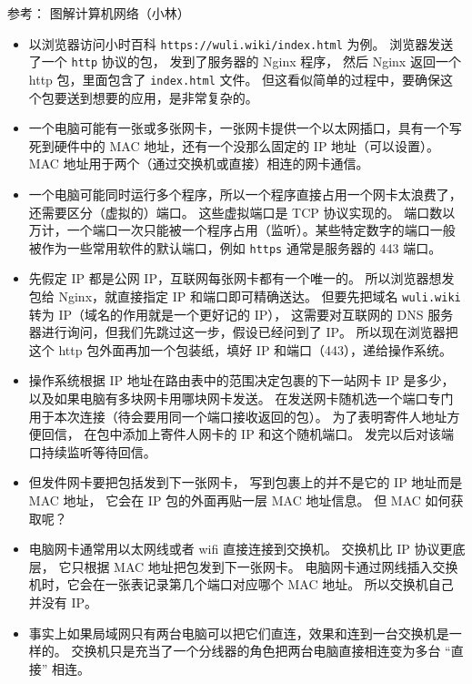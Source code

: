 
\begin{issues}
\issueDraft
\end{issues}

参考： 图解计算机网络（小林）

\begin{itemize}
\item 以浏览器访问小时百科 \verb`https://wuli.wiki/index.html` 为例。 浏览器发送了一个 \verb`http` 协议的包， 发到了服务器的 Nginx 程序， 然后 Nginx 返回一个 http 包，里面包含了 \verb`index.html` 文件。 但这看似简单的过程中，要确保这个包要送到想要的应用，是非常复杂的。
\item 一个电脑可能有一张或多张网卡，一张网卡提供一个以太网插口，具有一个写死到硬件中的 MAC 地址，还有一个没那么固定的 IP 地址（可以设置）。 MAC 地址用于两个（通过交换机或直接）相连的网卡通信。
\item 一个电脑可能同时运行多个程序，所以一个程序直接占用一个网卡太浪费了，还需要区分（虚拟的）端口。 这些虚拟端口是 TCP 协议实现的。 端口数以万计，一个端口一次只能被一个程序占用（监听）。某些特定数字的端口一般被作为一些常用软件的默认端口，例如 \verb`https` 通常是服务器的 443 端口。
\item 先假定 IP 都是公网 IP，互联网每张网卡都有一个唯一的。 所以浏览器想发包给 Nginx，就直接指定 IP 和端口即可精确送达。 但要先把域名 \verb`wuli.wiki` 转为 IP（域名的作用就是一个更好记的 IP）， 这需要对互联网的 DNS 服务器进行询问，但我们先跳过这一步，假设已经问到了 IP。 所以现在浏览器把这个 http 包外面再加一个包装纸，填好 IP 和端口（443），递给操作系统。
\item 操作系统根据 IP 地址在路由表中的范围决定包裹的下一站网卡 IP 是多少， 以及如果电脑有多块网卡用哪块网卡发送。 在发送网卡随机选一个端口专门用于本次连接（待会要用同一个端口接收返回的包）。 为了表明寄件人地址方便回信， 在包中添加上寄件人网卡的 IP 和这个随机端口。 发完以后对该端口持续监听等待回信。
\item 但发件网卡要把包括发到下一张网卡， 写到包裹上的并不是它的 IP 地址而是 MAC 地址， 它会在 IP 包的外面再贴一层 MAC 地址信息。 但 MAC 如何获取呢？
\item 电脑网卡通常用以太网线或者 wifi 直接连接到交换机。 交换机比 IP 协议更底层， 它只根据 MAC 地址把包发到下一张网卡。 电脑网卡通过网线插入交换机时，它会在一张表记录第几个端口对应哪个 MAC 地址。 所以交换机自己并没有 IP。
\item 事实上如果局域网只有两台电脑可以把它们直连，效果和连到一台交换机是一样的。 交换机只是充当了一个分线器的角色把两台电脑直接相连变为多台 “直接” 相连。

\end{itemize}

